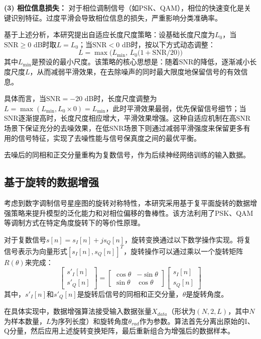 \documentclass[conference]{IEEEtran}
\begin{document}
\textbf{(3) 相位信息损失：} 对于相位调制信号（如PSK、QAM），相位的快速变化是关键识别特征。过度平滑会导致相位信息的损失，严重影响分类准确率。

基于上述分析，本研究提出自适应长度尺度策略：设基础长度尺度为$L_0$，当$\mathrm{SNR}\ge0$ dB时取$L=L_0$；当$\mathrm{SNR}<0$ dB时，按以下方式动态调整：
\begin{equation}
L = \max\bigl(L_{\min},\,L_0\bigl(1+\mathrm{SNR}/20\bigr)\bigr)
\end{equation}
其中$L_{\min}$是预设的最小尺度。该策略的核心思想是：随着SNR的降低，逐渐减小长度尺度$L$，从而减弱平滑效果，在去除噪声的同时最大限度地保留信号的有效信息。

具体而言，当$\mathrm{SNR}=-20$ dB时，长度尺度调整为$L=\max(L_{\min}, L_0 \times 0)=L_{\min}$，此时平滑效果最弱，优先保留信号细节；当SNR逐渐提高时，长度尺度相应增大，平滑效果增强。这种自适应机制在高SNR场景下保证充分的去噪效果，在低SNR场景下则通过减弱平滑强度来保留更多有用的信号特征，实现了去噪性能与信号保真度之间的最优平衡。

去噪后的同相和正交分量重构为复数信号，作为后续神经网络训练的输入数据。
\subsection{基于旋转的数据增强}

考虑到数字调制信号星座图的旋转对称特性，本研究采用基于复平面旋转的数据增强策略来提升模型的泛化能力和对相位偏移的鲁棒性。该方法利用了PSK、QAM等调制方式在特定角度旋转下的等价性原理。 %

对于复数信号$s[n] = s_I[n] + js_Q[n]$，旋转变换通过以下数学操作实现。将复信号表示为向量形式$[s_I[n], s_Q[n]]^T$，旋转操作可以通过乘以一个旋转矩阵$R(\theta)$来完成：
\begin{equation}
\begin{bmatrix} s'_I[n] \\ s'_Q[n] \end{bmatrix} = \begin{bmatrix} \cos\theta & -\sin\theta \\ \sin\theta & \cos\theta \end{bmatrix} \begin{bmatrix} s_I[n] \\ s_Q[n] \end{bmatrix}
\end{equation}
其中，$s'_I[n]$和$s'_Q[n]$是旋转后信号的同相和正交分量，$\theta$是旋转角度。

在具体实现中，数据增强算法接受输入数据张量$X_{data}$（形状为$(N, 2, L)$，其中$N$为样本数量，$L$为序列长度）和旋转角度$\theta_{rad}$作为参数。算法首先分离出原始的I、Q分量，然后应用上述旋转变换矩阵，最后重新组合为增强后的数据样本。
\end{document}
